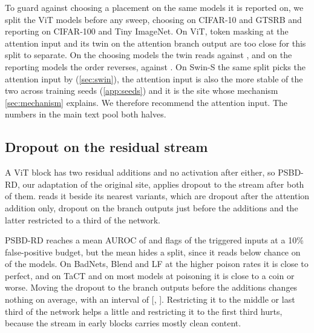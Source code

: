 To guard against choosing a placement on the same models it is reported on, we split the ViT models before any sweep, choosing on CIFAR-10 and GTSRB and reporting on CIFAR-100 and Tiny ImageNet. On ViT, token masking at the attention input and its twin on the attention branch output are too close for this split to separate. On the \GainsSelectionHalfN{} choosing models the twin reads \GainsSelectionHalfTwin{} against \GainsSelectionHalfOurs{}, and on the \GainsReportHalfN{} reporting models the order reverses, \GainsReportHalfOurs{} against \GainsReportHalfTwin{}. On Swin-S the same split picks the attention input by \SwinSelectionHalfTwinGap{} (\cref{sec:swin}), the attention input is also the more stable of the two across training seeds (\cref{app:seeds}) and it is the site whose mechanism \cref{sec:mechanism} explains. We therefore recommend the attention input. The numbers in the main text pool both halves.


\subsection{Dropout on the residual stream}
\label{sec:results:residual}\label{app:walk}

A ViT block has two residual additions and no activation after either, so PSBD-RD, our adaptation of the original site, applies dropout to the stream after both of them.  reads it beside its nearest variants, which are dropout after the attention addition only, dropout on the branch outputs just before the additions and the latter restricted to a third of the network.



PSBD-RD reaches a mean AUROC of \StaircaseResidualPostResidualAuroc{} and flags \StaircaseResidualPostResidualTprAtOneZeroPercent{} of the triggered inputs at a 10\% false-positive budget, but the mean hides a split, since it reads below chance on \StaircaseResidualPostResidualBelowChance{} of the \StaircaseResidualPostResidualN{} models. On BadNets, Blend and LF at the higher poison rates it is close to perfect, and on TaCT and on most models at \PanelRateLow{} poisoning it is close to a coin or worse. Moving the dropout to the branch outputs before the additions changes nothing on average, \StaircaseResidualPreResidualGain{} with an interval of [\StaircaseResidualPreResidualGainLow{}, \StaircaseResidualPreResidualGainHigh{}]. Restricting it to the middle or last third of the network helps a little and restricting it to the first third hurts, because the stream in early blocks carries mostly clean content.


